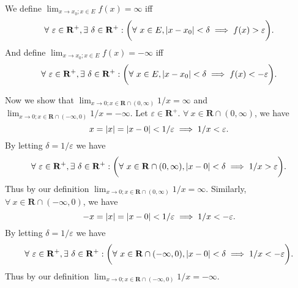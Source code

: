 \begin{definition}
    We define \(\lim_{x \to x_0 ; x \in E} f(x) = \infty\) iff
    \[
        \forall\ \varepsilon \in \mathbf{R}^+, \exists\ \delta \in \mathbf{R}^+ : \bigg(\forall\ x \in E, \abs*{x - x_0} < \delta \implies f(x) > \varepsilon\bigg).
    \]
    And define \(\lim_{x \to x_0 ; x \in E} f(x) = -\infty\) iff
    \[
        \forall\ \varepsilon \in \mathbf{R}^+, \exists\ \delta \in \mathbf{R}^+ : \bigg(\forall\ x \in E, \abs*{x - x_0} < \delta \implies f(x) < -\varepsilon\bigg).
    \]

    Now we show that \(\lim_{x \to 0 ; x \in \mathbf{R} \cap (0, \infty)} 1 / x = \infty\) and \(\lim_{x \to 0 ; x \in \mathbf{R} \cap (-\infty, 0)} 1 / x = -\infty\).
    Let \(\varepsilon \in \mathbf{R}^+\).
    \(\forall\ x \in \mathbf{R} \cap (0, \infty)\), we have
    \[
        x = \abs*{x} = \abs*{x - 0} < 1 / \varepsilon \implies 1 / x < \varepsilon.
    \]
    By letting \(\delta = 1 / \varepsilon\) we have
    \[
        \forall\ \varepsilon \in \mathbf{R}^+, \exists\ \delta \in \mathbf{R}^+ : \bigg(\forall\ x \in \mathbf{R} \cap (0, \infty), \abs*{x - 0} < \delta \implies 1 / x > \varepsilon\bigg).
    \]
    Thus by our definition \(\lim_{x \to 0 ; x \in \mathbf{R} \cap (0, \infty)} 1 / x = \infty\).
    Similarly, \(\forall\ x \in \mathbf{R} \cap (-\infty, 0)\), we have
    \[
        -x = \abs*{x} = \abs*{x - 0} < 1 / \varepsilon \implies 1 / x < -\varepsilon.
    \]
    By letting \(\delta = 1 / \varepsilon\) we have
    \[
        \forall\ \varepsilon \in \mathbf{R}^+, \exists\ \delta \in \mathbf{R}^+ : \bigg(\forall\ x \in \mathbf{R} \cap (-\infty, 0), \abs*{x - 0} < \delta \implies 1 / x < -\varepsilon\bigg).
    \]
    Thus by our definition \(\lim_{x \to 0 ; x \in \mathbf{R} \cap (-\infty, 0)} 1 / x = -\infty\).


\end{definition}
